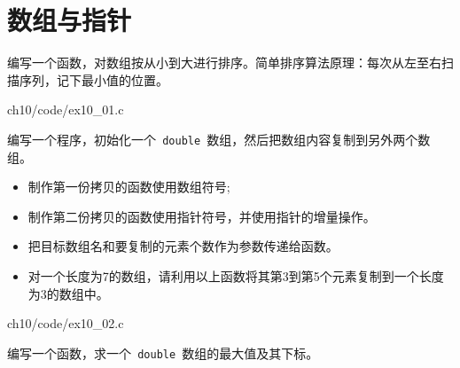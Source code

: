 \section{数组与指针}

\begin{frame}[fragile]\ft{\secname}
\begin{biancheng} 
  编写一个函数，对数组按从小到大进行排序。简单排序算法原理：每次从左至右扫描序列，记下最小值的位置。
\end{biancheng}
\end{frame}


\begin{frame}\ft{\secname}

{ch10/code/ex10_01.c}
\end{frame}


\begin{frame}[fragile]\ft{\secname}
\begin{biancheng} 
编写一个程序，初始化一个\lstinline| double |数组，然后把数组内容复制到另外两个数组。
\begin{itemize}
\item 制作第一份拷贝的函数使用数组符号;
\item 制作第二份拷贝的函数使用指针符号，并使用指针的增量操作。
\item 把目标数组名和要复制的元素个数作为参数传递给函数。
\item 对一个长度为7的数组，请利用以上函数将其第3到第5个元素复制到一个长度为3的数组中。
\end{itemize}
\end{biancheng}
\end{frame}

\begin{frame}\ft{\secname}

{ch10/code/ex10_02.c}
\end{frame}

 



\begin{frame}[fragile]\ft{\secname}
\begin{biancheng} 
编写一个函数，求一个\lstinline| double |数组的最大值及其下标。
\end{biancheng}
\end{frame}

